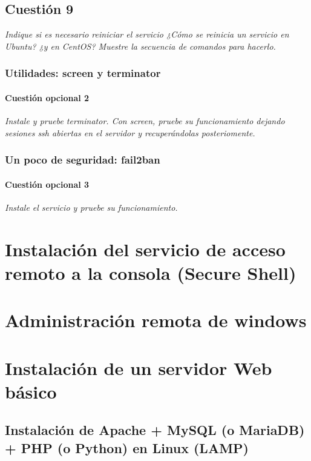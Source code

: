 \subsection{Cuestión 9}
\textit{Indique si es necesario reiniciar el servicio ¿Cómo se reinicia un servicio en Ubuntu? ¿y en CentOS? Muestre la secuencia de comandos para hacerlo.}


\subsubsection{Utilidades: screen y terminator}
\paragraph{Cuestión opcional 2}
\textit{Instale y pruebe terminator. Con screen, pruebe su funcionamiento dejando sesiones ssh abiertas en el servidor y recuperándolas posteriomente.}


\subsubsection{Un poco de seguridad: fail2ban}
\paragraph{Cuestión opcional 3}
\textit{Instale el servicio y pruebe su funcionamiento.}


\section{Instalación del servicio de acceso remoto a la consola (Secure Shell)}


\section{Administración remota de windows}


\section{Instalación de un servidor Web básico}

\subsection{Instalación de Apache + MySQL (o MariaDB) + PHP (o Python) en Linux (LAMP)}
